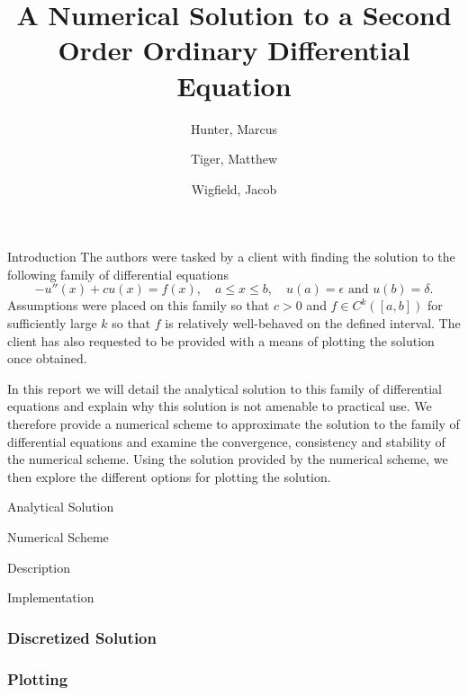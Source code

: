 \documentclass{article}
\title{
	{A Numerical Solution to a Second Order Ordinary Differential Equation}\\
}
\author{
	Hunter, Marcus \\
	\and
	Tiger, Matthew \\
	\and
	Wigfield, Jacob \\
}
\begin{document}
\maketitle
\newpage


\tableofcontents
\newpage


\begin{section}{Introduction}
  The authors were tasked by a client with finding the solution to the following
  family of differential equations
  \[
  -u''(x) + c u(x) = f(x), \quad a \leq x \leq b, \quad u(a) = \epsilon \text{ and } u(b) = \delta.
  \]
  Assumptions were placed on this family so that $c > 0$ and $f \in C^k([a,b])$
  for sufficiently large $k$ so that $f$ is relatively well-behaved on the defined interval. The client has also requested
  to be provided with a means of plotting the solution once obtained.

  In this report we will detail the analytical solution to this family of differential
  equations and explain why this solution is not amenable to practical use. We
  therefore provide a numerical scheme to approximate the solution to the family
  of differential equations and examine the convergence, consistency and stability
  of the numerical scheme. Using the solution provided by the numerical scheme,
  we then explore the different options for plotting the solution.

\end{section}


\begin{section}{Analytical Solution}
\end{section}


\begin{section}{Numerical Scheme}

  \begin{subsection}{Description}
  \end{subsection}

  \begin{subsection}{Implementation}

    \subsubsection{Discretized Solution}

    \subsubsection{Plotting}

  \end{subsection}

\end{section}
\end{document}
